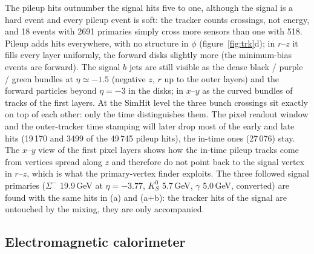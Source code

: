 \documentclass[11pt,a4paper]{article}
\begin{document}
The pileup hits outnumber the signal hits five to one, although the signal is a hard event and every pileup
event is soft: the tracker counts crossings, not energy, and 18 events with 2691 primaries simply cross more
sensors than one with 518. Pileup adds hits everywhere, with no structure in $\phi$ (figure~\ref{fig:trk}d);
in $r$--$z$ it fills every layer uniformly, the forward disks slightly more (the minimum-bias events are
forward). The signal $b$ jets are still visible as the dense black / purple / green bundles at
$\eta\simeq-1.5$ (negative $z$, $r$ up to the outer layers) and the forward particles beyond $\eta=-3$ in the
disks; in $x$--$y$ as the curved bundles of tracks of the first layers. At the SimHit level the three bunch
crossings sit exactly on top of each other: only the time distinguishes them. The pixel readout window and the
outer-tracker time stamping will later drop most of the early and late hits (19\,170 and 3499 of the 49\,745
pileup hits), the in-time ones (27\,076) stay. The $x$--$y$ view of the first pixel layers shows how the
in-time pileup tracks come from vertices spread along $z$ and therefore do not point back to the signal
vertex in $r$--$z$, which is what the primary-vertex finder exploits. The three followed signal primaries
($\Sigma^-$ 19.9\,GeV at $\eta=-3.77$, $K^0_S$ 5.7\,GeV, $\gamma$ 5.0\,GeV, converted) are found with the same
hits in (a) and (a+b): the tracker hits of the signal are untouched by the mixing, they are only accompanied.

\FloatBarrier
\subsection{Electromagnetic calorimeter}
\end{document}
